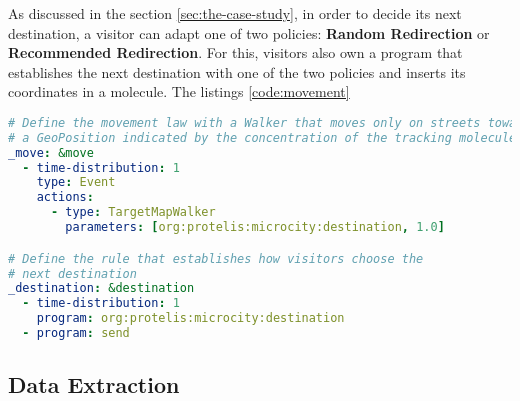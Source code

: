 As discussed in the section \ref{sec:the-case-study}, in order to decide its next destination, a visitor can adapt one of two policies: \textbf{Random Redirection} or \textbf{Recommended Redirection}. For this, visitors also own a program that establishes the next destination with one of the two policies and inserts its coordinates in a molecule. The listings \ref{code:movement}

\begin{lstlisting}[language=yaml, label=code:movement, caption=Define the movement behaviour for visitors.]
# Define the movement law with a Walker that moves only on streets towards
# a GeoPosition indicated by the concentration of the tracking molecule
_move: &move
  - time-distribution: 1
    type: Event
    actions:
      - type: TargetMapWalker
        parameters: [org:protelis:microcity:destination, 1.0]

# Define the rule that establishes how visitors choose the
# next destination
_destination: &destination
  - time-distribution: 1
    program: org:protelis:microcity:destination
  - program: send
\end{lstlisting}


\subsection{Data Extraction}